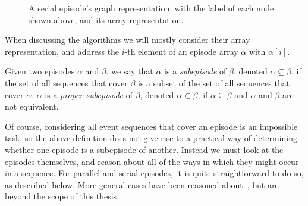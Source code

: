 \begin{figure}
\centering


\caption{A serial episode's graph representation, with the label of each node shown above, and its array representation.}
\label{fig:serial-representation}
\end{figure}

When discussing the algorithms we will mostly consider their array representation, and address the $ i $-th element of an episode array $ \alpha $ with $ \alpha [i] $.

\begin{definition}
Given two episodes $ \alpha $ and $ \beta $, we say that $ \alpha $ is a \emph{subepisode} of $ \beta $, denoted $ \alpha \subseteq \beta $, if the set of all sequences that cover $ \beta $ is a subset of the set of all sequences that cover $ \alpha $. $ \alpha $ is a \emph{proper subepisode} of $ \beta $, denoted $ \alpha \subset \beta $, if $ \alpha \subseteq \beta $ and $ \alpha $ and $ \beta $ are not equivalent.
\end{definition}

Of course, considering all event sequences that cover an episode is an impossible task, so the above definition does not give rise to a practical way of determining whether one episode is a subepisode of another. Instead we must look at the episodes themselves, and reason about all of the ways in which they might occur in a sequence. For parallel and serial episodes, it is quite straightforward to do so, as described below. More general cases have been reasoned about~\cite{tatti2012mining}, but are beyond the scope of this thesis.

